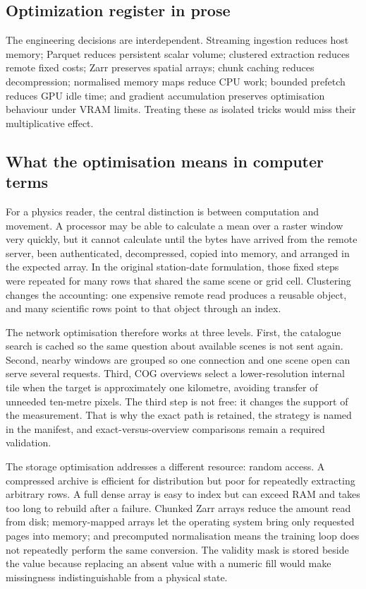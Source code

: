 \documentclass[12pt,a4paper]{report}
\begin{document}
\subsection{Optimization register in prose}
The engineering decisions are interdependent. Streaming ingestion reduces host
memory; Parquet reduces persistent scalar volume; clustered extraction reduces
remote fixed costs; Zarr preserves spatial arrays; chunk caching reduces
decompression; normalised memory maps reduce CPU work; bounded prefetch reduces
GPU idle time; and gradient accumulation preserves optimisation behaviour under
VRAM limits. Treating these as isolated tricks would miss their multiplicative
effect.

\subsection{What the optimisation means in computer terms}
For a physics reader, the central distinction is between computation and
movement. A processor may be able to calculate a mean over a raster window very
quickly, but it cannot calculate until the bytes have arrived from the remote
server, been authenticated, decompressed, copied into memory, and arranged in
the expected array. In the original station-date formulation, those fixed
steps were repeated for many rows that shared the same scene or grid cell.
Clustering changes the accounting: one expensive remote read produces a
reusable object, and many scientific rows point to that object through an
index.

The network optimisation therefore works at three levels. First, the catalogue
search is cached so the same question about available scenes is not sent again.
Second, nearby windows are grouped so one connection and one scene open can
serve several requests. Third, COG overviews select a lower-resolution internal
tile when the target is approximately one kilometre, avoiding transfer of
unneeded ten-metre pixels. The third step is not free: it changes the support of
the measurement. That is why the exact path is retained, the strategy is named
in the manifest, and exact-versus-overview comparisons remain a required
validation.

The storage optimisation addresses a different resource: random access. A
compressed archive is efficient for distribution but poor for repeatedly
extracting arbitrary rows. A full dense array is easy to index but can exceed
RAM and takes too long to rebuild after a failure. Chunked Zarr arrays reduce
the amount read from disk; memory-mapped arrays let the operating system bring
only requested pages into memory; and precomputed normalisation means the
training loop does not repeatedly perform the same conversion. The validity
mask is stored beside the value because replacing an absent value with a
numeric fill would make missingness indistinguishable from a physical state.
\end{document}
